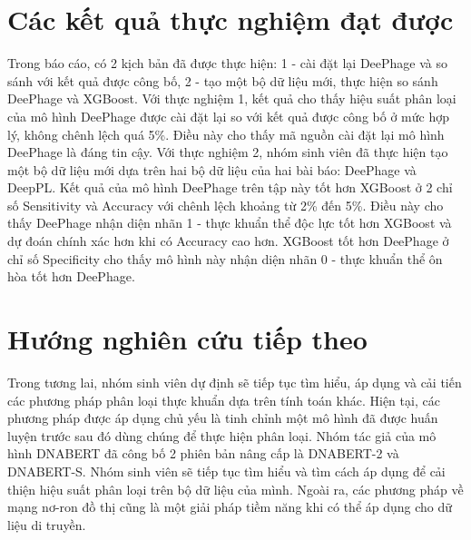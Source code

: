 \section{Các kết quả thực nghiệm đạt được}
Trong báo cáo, có 2 kịch bản đã được thực hiện: 1 - cài đặt lại DeePhage và so sánh với kết quả được công bố, 2 - tạo một bộ dữ liệu mới, thực hiện so sánh DeePhage và XGBoost. Với thực nghiệm 1, kết quả cho thấy hiệu suất phân loại của mô hình DeePhage được cài đặt lại so với kết quả được công bố ở mức hợp lý, không chênh lệch quá 5\%. Điều này cho thấy mã nguồn cài đặt lại mô hình DeePhage là đáng tin cậy. Với thực nghiệm 2, nhóm sinh viên đã thực hiện tạo một bộ dữ liệu mới dựa trên hai bộ dữ liệu của hai bài báo: DeePhage\cite{wu2021deephage} và DeepPL\cite{zhang2024deeppl}. Kết quả của mô hình DeePhage trên tập này tốt hơn XGBoost ở 2 chỉ số Sensitivity và Accuracy với chênh lệch khoảng từ 2\% đến 5\%. Điều này cho thấy DeePhage nhận diện nhãn 1 - thực khuẩn thể độc lực tốt hơn XGBoost và dự đoán chính xác hơn khi có Accuracy cao hơn. XGBoost tốt hơn DeePhage ở chỉ số Specificity cho thấy mô hình này nhận diện nhãn 0 - thực khuẩn thể ôn hòa tốt hơn DeePhage.

\section{Hướng nghiên cứu tiếp theo}
Trong tương lai, nhóm sinh viên dự định sẽ tiếp tục tìm hiểu, áp dụng và cải tiến các phương pháp phân loại thực khuẩn dựa trên tính toán khác. Hiện tại, các phương pháp được áp dụng chủ yếu là tinh chỉnh một mô hình đã được huấn luyện trước sau đó dùng chúng để thực hiện phân loại. Nhóm tác giả của mô hình DNABERT\cite{ji2021dnabert} đã công bố 2 phiên bản nâng cấp là DNABERT-2\cite{zhou2023dnabert} và DNABERT-S\cite{zhou2024dnabert}. Nhóm sinh viên sẽ tiếp tục tìm hiểu và tìm cách áp dụng để cải thiện hiệu suất phân loại trên bộ dữ liệu của mình. Ngoài ra, các phương pháp về mạng nơ-ron đồ thị cũng là một giải pháp tiềm năng khi có thể áp dụng cho dữ liệu di truyền.